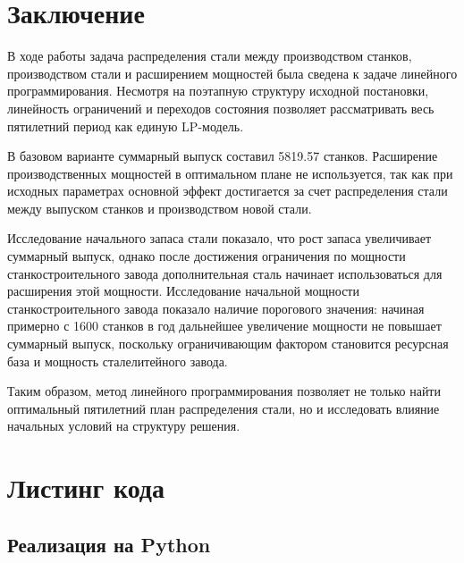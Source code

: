 \documentclass[a4paper,12pt]{article}
\begin{document}
\section{Заключение}

В ходе работы задача распределения стали между производством станков,
производством стали и расширением мощностей была сведена к задаче линейного
программирования. Несмотря на поэтапную структуру исходной постановки,
линейность ограничений и переходов состояния позволяет рассматривать весь
пятилетний период как единую LP-модель.

В базовом варианте суммарный выпуск составил 5819.57 станков. Расширение
производственных мощностей в оптимальном плане не используется, так как при
исходных параметрах основной эффект достигается за счет распределения стали
между выпуском станков и производством новой стали.

Исследование начального запаса стали показало, что рост запаса увеличивает
суммарный выпуск, однако после достижения ограничения по мощности
станкостроительного завода дополнительная сталь начинает использоваться для
расширения этой мощности. Исследование начальной мощности станкостроительного
завода показало наличие порогового значения: начиная примерно с 1600 станков
в год дальнейшее увеличение мощности не повышает суммарный выпуск, поскольку
ограничивающим фактором становится ресурсная база и мощность сталелитейного
завода.

Таким образом, метод линейного программирования позволяет не только найти
оптимальный пятилетний план распределения стали, но и исследовать влияние
начальных условий на структуру решения.

\pagebreak
\section{Листинг кода}

\subsection{Реализация на Python}


\end{document}

